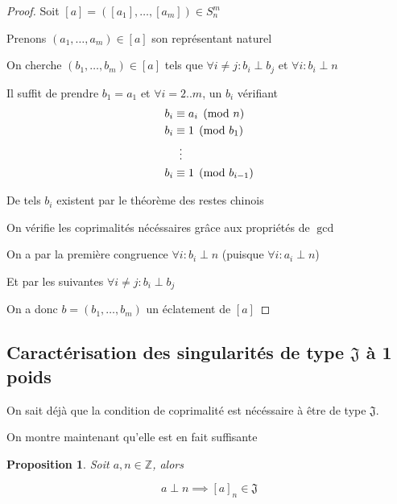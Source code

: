 \documentclass{article}
\newtheorem{proposition}{Proposition}
\begin{document}
\begin{proof}
    Soit $[a] = ([a_1], \dots, [a_m]) \in S_n^m$

    Prenons $(a_1, \dots, a_m) \in [a]$ son représentant naturel

    On cherche $(b_1, \dots, b_m) \in [a]$ tels que $\forall i \neq j : b_i \perp b_j$ et $\forall i : b_i \perp n$

    Il suffit de prendre $b_1 = a_1$ et $\forall i = 2..m$, un $b_i$ vérifiant
    \begin{align*}
        b_i & \equiv a_i \pmod n \\
        b_i & \equiv 1 \pmod {b_1} \\
            & \vdotswithin{\equiv} \\
        b_i & \equiv 1 \pmod {b_{i-1}} 
    \end{align*}

    De tels $b_i$ existent par le théorème des restes chinois

    On vérifie les coprimalités nécéssaires grâce aux propriétés de $\gcd$

    On a par la première congruence $\forall i : b_i \perp n$ (puisque $\forall i : a_i \perp n$)

    Et par les suivantes $\forall i \neq j : b_i \perp b_j$

    On a donc $b = (b_1, \dots, b_m)$ un éclatement de $[a]$
\end{proof}

\newpage

\subsection{Caractérisation des singularités de type \texorpdfstring{$\mathfrak{J}$}{J} à 1 poids}

On sait déjà que la condition de coprimalité est nécéssaire à être de type $\mathfrak{J}$. 

On montre maintenant qu'elle est en fait suffisante

\begin{proposition}
    Soit $a, n \in \mathbb{Z}$, alors

    \[ a \perp n \implies {[a]}_n \in \mathfrak{J} \]
\end{proposition}
\end{document}
